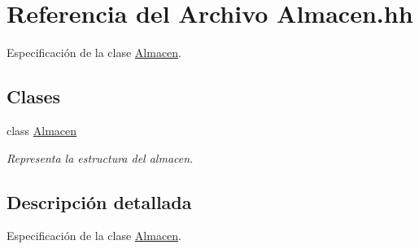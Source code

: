 \hypertarget{_almacen_8hh}{}\section{Referencia del Archivo Almacen.\+hh}
\label{_almacen_8hh}


Especificación de la clase \hyperlink{class_almacen}{Almacen}.  


\subsection*{Clases}
\begin{DoxyCompactItemize}
\item 
class \hyperlink{class_almacen}{Almacen}
\begin{DoxyCompactList}\small\item\em Representa la estructura del almacen. \end{DoxyCompactList}\end{DoxyCompactItemize}


\subsection{Descripción detallada}
Especificación de la clase \hyperlink{class_almacen}{Almacen}. 

